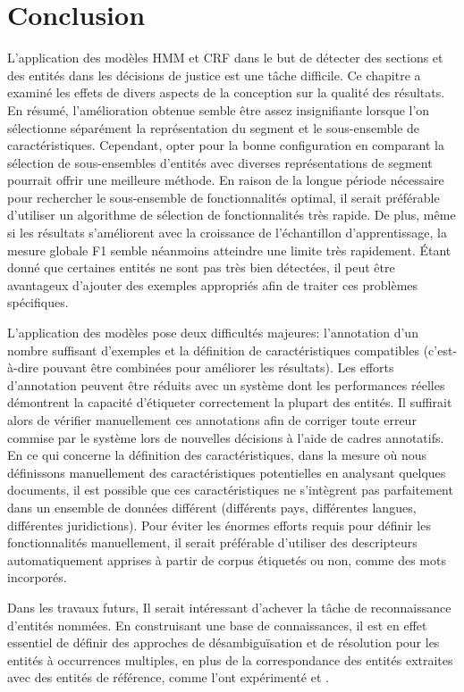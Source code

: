 \section{Conclusion}
\label{sec:structuration:conclusion}
L'application des modèles HMM et CRF dans le but de détecter des sections et des entités dans les décisions de justice est une tâche difficile. Ce chapitre a examiné les effets de divers aspects de la conception sur la qualité des résultats. En résumé, l'amélioration obtenue semble être assez insignifiante lorsque l'on sélectionne séparément la représentation du segment et le sous-ensemble de caractéristiques. Cependant, opter pour la bonne configuration en comparant la sélection de sous-ensembles d'entités avec diverses représentations de segment pourrait offrir une meilleure méthode. En raison de la longue période nécessaire pour rechercher le sous-ensemble de fonctionnalités optimal, il serait préférable d'utiliser un algorithme de sélection de fonctionnalités très rapide. De plus, même si les résultats s'améliorent avec la croissance de l'échantillon d'apprentissage, la mesure globale F1 semble néanmoins atteindre une limite très rapidement. Étant donné que certaines entités ne sont pas très bien détectées, il peut être avantageux d'ajouter des exemples appropriés afin de traiter ces problèmes spécifiques.

L'application des modèles pose deux difficultés majeures: l'annotation d'un nombre suffisant d'exemples et la définition de caractéristiques compatibles (c'est-à-dire pouvant être combinées pour améliorer les résultats). Les efforts d'annotation peuvent être réduits avec un système dont les performances réelles démontrent la capacité d'étiqueter correctement la plupart des entités. Il suffirait alors de vérifier manuellement ces annotations afin de corriger toute erreur commise par le système lors de nouvelles décisions à l'aide de cadres annotatifs. En ce qui concerne la définition des caractéristiques, dans la mesure où nous définissons manuellement des caractéristiques potentielles en analysant quelques documents, il est possible que ces caractéristiques ne s'intègrent pas parfaitement dans un ensemble de données différent (différents pays, différentes langues, différentes juridictions). Pour éviter les énormes efforts requis pour définir les fonctionnalités manuellement, il serait préférable d'utiliser des descripteurs automatiquement apprises à partir de corpus étiquetés ou non, comme des mots incorporés.

Dans les travaux futurs, Il serait intéressant d'achever la tâche de reconnaissance d'entités nommées. En construisant une base de connaissances, il est en effet essentiel de définir des approches de désambiguïsation et de résolution pour les entités à occurrences multiples, en plus de la correspondance des entités extraites avec des entités de référence, comme l'ont expérimenté \citet{dozier2010legalnerr} et \citet{cardellino2017legalNERCL}. 